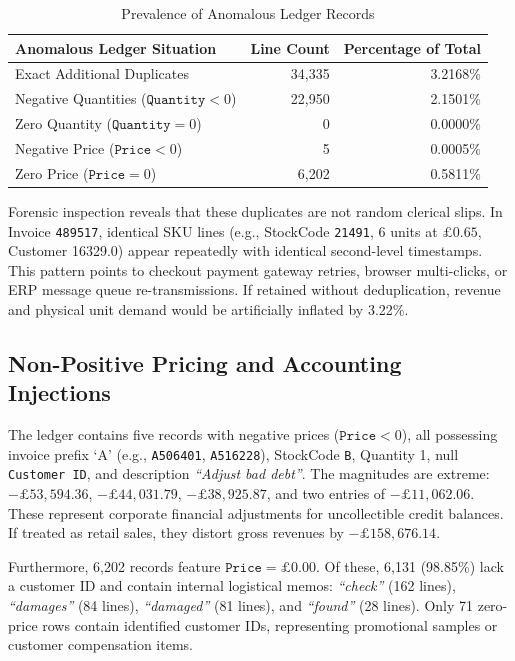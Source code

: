 \documentclass[journal,10pt,twocolumn]{IEEEtran}
\begin{document}
\begin{table}[htbp]
\caption{Prevalence of Anomalous Ledger Records}
\label{tab:situations_table}
\centering
\begin{tabularx}{\columnwidth}{Xrr}
\toprule
\textbf{Anomalous Ledger Situation} & \textbf{Line Count} & \textbf{Percentage of Total} \\
\midrule
Exact Additional Duplicates & 34,335 & 3.2168\% \\
Negative Quantities ($\texttt{Quantity} < 0$) & 22,950 & 2.1501\% \\
Zero Quantity ($\texttt{Quantity} = 0$) & 0 & 0.0000\% \\
Negative Price ($\texttt{Price} < 0$) & 5 & 0.0005\% \\
Zero Price ($\texttt{Price} = 0$) & 6,202 & 0.5811\% \\
\bottomrule
\end{tabularx}
\end{table}

Forensic inspection reveals that these duplicates are not random clerical slips. In Invoice \texttt{489517}, identical SKU lines (e.g., StockCode \texttt{21491}, 6 units at $\pounds 0.65$, Customer 16329.0) appear repeatedly with identical second-level timestamps. This pattern points to checkout payment gateway retries, browser multi-clicks, or ERP message queue re-transmissions. If retained without deduplication, revenue and physical unit demand would be artificially inflated by 3.22\%.

\subsection{Non-Positive Pricing and Accounting Injections}
The ledger contains five records with negative prices ($\texttt{Price} < 0$), all possessing invoice prefix `A' (e.g., \texttt{A506401}, \texttt{A516228}), StockCode \texttt{B}, Quantity 1, null \texttt{Customer ID}, and description \textit{``Adjust bad debt''}. The magnitudes are extreme: $-\pounds 53,594.36$, $-\pounds 44,031.79$, $-\pounds 38,925.87$, and two entries of $-\pounds 11,062.06$. These represent corporate financial adjustments for uncollectible credit balances. If treated as retail sales, they distort gross revenues by $-\pounds 158,676.14$.

Furthermore, 6,202 records feature $\texttt{Price} = \pounds 0.00$. Of these, 6,131 (98.85\%) lack a customer ID and contain internal logistical memos: \textit{``check''} (162 lines), \textit{``damages''} (84 lines), \textit{``damaged''} (81 lines), and \textit{``found''} (28 lines). Only 71 zero-price rows contain identified customer IDs, representing promotional samples or customer compensation items.
\end{document}
